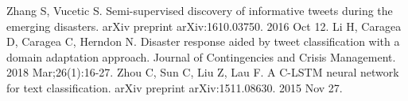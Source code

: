 \documentclass[unicode, 12pt, a4paper,oneside]{article}
\begin{document}
\begin{thebibliography}{10}
		 Zhang S, Vucetic S. Semi-supervised discovery of informative tweets during the emerging disasters. arXiv preprint arXiv:1610.03750. 2016 Oct 12.
		 Li H, Caragea D, Caragea C, Herndon N. Disaster response aided by tweet classification with a domain adaptation approach. Journal of Contingencies and Crisis Management. 2018 Mar;26(1):16-27.
		 Zhou C, Sun C, Liu Z, Lau F. A C-LSTM neural network for text classification. arXiv preprint arXiv:1511.08630. 2015 Nov 27.

	\end{thebibliography}
		
\end{document}
